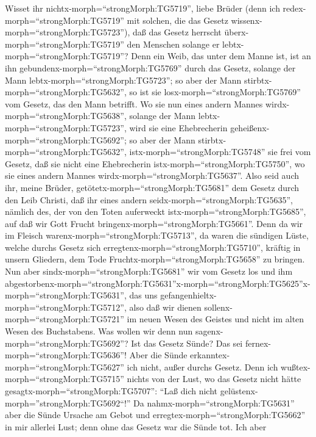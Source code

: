  Wisset ihr nichtx-morph=``strongMorph:TG5719'', liebe
Brüder (denn ich redex-morph=``strongMorph:TG5719'' mit solchen, die das
Gesetz wissenx-morph=``strongMorph:TG5723''), daß das Gesetz herrscht
überx-morph=``strongMorph:TG5719'' den Menschen solange er
lebtx-morph=``strongMorph:TG5719''?  Denn ein Weib, das
unter dem Manne ist, ist an ihn gebundenx-morph=``strongMorph:TG5769''
durch das Gesetz, solange der Mann lebtx-morph=``strongMorph:TG5723'';
so aber der Mann stirbtx-morph=``strongMorph:TG5632'', so ist sie
losx-morph=``strongMorph:TG5769'' vom Gesetz, das den Mann betrifft.
 Wo sie nun eines andern Mannes
wirdx-morph=``strongMorph:TG5638'', solange der Mann
lebtx-morph=``strongMorph:TG5723'', wird sie eine Ehebrecherin
geheißenx-morph=``strongMorph:TG5692''; so aber der Mann
stirbtx-morph=``strongMorph:TG5632'', istx-morph=``strongMorph:TG5748''
sie frei vom Gesetz, daß sie nicht eine Ehebrecherin
istx-morph=``strongMorph:TG5750'', wo sie eines andern Mannes
wirdx-morph=``strongMorph:TG5637''.  Also seid auch ihr,
meine Brüder, getötetx-morph=``strongMorph:TG5681'' dem Gesetz durch den
Leib Christi, daß ihr eines andern seidx-morph=``strongMorph:TG5635'',
nämlich des, der von den Toten auferweckt
istx-morph=``strongMorph:TG5685'', auf daß wir Gott Frucht
bringenx-morph=``strongMorph:TG5661''.  Denn da wir im
Fleisch warenx-morph=``strongMorph:TG5713'', da waren die sündigen
Lüste, welche durchs Gesetz sich erregtenx-morph=``strongMorph:TG5710'',
kräftig in unsern Gliedern, dem Tode
Fruchtx-morph=``strongMorph:TG5658'' zu bringen.  Nun aber
sindx-morph=``strongMorph:TG5681'' wir vom Gesetz los und ihm
abgestorbenx-morph=``strongMorph:TG5631''\textbar x-morph=``strongMorph:TG5625''x-morph=``strongMorph:TG5631'',
das uns gefangenhieltx-morph=``strongMorph:TG5712'', also daß wir dienen
sollenx-morph=``strongMorph:TG5721'' im neuen Wesen des Geistes und
nicht im alten Wesen des Buchstabens.  Was wollen wir denn
nun sagenx-morph=``strongMorph:TG5692''? Ist das Gesetz Sünde? Das sei
fernex-morph=``strongMorph:TG5636''! Aber die Sünde
erkanntex-morph=``strongMorph:TG5627'' ich nicht, außer durchs Gesetz.
Denn ich wußtex-morph=``strongMorph:TG5715'' nichts von der Lust, wo das
Gesetz nicht hätte gesagtx-morph=``strongMorph:TG5707'': ``Laß dich
nicht gelüstenx-morph=''strongMorph:TG5692``!''  Da
nahmx-morph=``strongMorph:TG5631'' aber die Sünde Ursache am Gebot und
erregtex-morph=``strongMorph:TG5662'' in mir allerlei Lust; denn ohne
das Gesetz war die Sünde tot.  Ich aber
